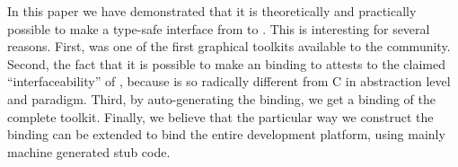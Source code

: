 \documentclass[finalversion]{usetex-v1}
\begin{document}

In this paper we have demonstrated that it is theoretically and
practically possible to make a type-safe interface from \sml to \gtk.
This is interesting for several reasons. First, \mgtk was one of the
first graphical toolkits available to the \sml community. Second, the
fact that it is possible to make an \sml binding to \gtk
attests to the claimed ``interfaceability'' of \gtk, because \sml is so
radically different from C in abstraction level and paradigm. Third,
by auto-generating the binding, we get a binding of the complete \gtk
toolkit. Finally, we believe that the particular way we construct the
binding can be extended to bind the
entire \gnome development platform, using mainly machine generated
stub code.



\end{document}
